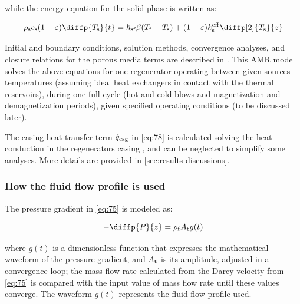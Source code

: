 \documentclass[referee]{svjour3}
\begin{document}


\noindent while the energy equation for the solid phase is written as:

\begin{equation}
\label{eq:88}
  \rho\ped{s} c\ped{s}(1 - \varepsilon)\diffp{T\ped{s}}{t} = \hheat\ped{sf}\beta(T\ped{f}-T\ped{s}) + (1-\varepsilon)k\ped{s}\ap{eff}\diffp[2]{T\ped{s}}{z}
\end{equation}

Initial and boundary conditions, solution methods, convergence analyses, and closure relations for the porous media terms are described in \cite{bib:trevizoli16_perfor_model}. This AMR model solves the above equations for one regenerator operating between given sources temperatures (assuming ideal heat exchangers in contact with the thermal reservoirs), during one full cycle (hot and cold blows and  magnetization and demagnetization periods), given specified operating conditions (to be discussed later).

The casing heat transfer term $\dot{q}_{\mathrm{csg}}$ in \autoref{eq:78} is calculated solving the heat conduction in the regenerators casing \cite{bib:trevizoli16_perfor_model}, and can be neglected to simplify some analyses. More details are provided in \autoref{sec:results-discussions}.

\subsubsection{How the fluid flow profile is used}
\label{sec:how-fluid-flow}

The pressure gradient in \autoref{eq:75} is modeled as:

\begin{equation}
\label{eq:76}
-\diffp{P}{z} = \rho\ped{f} A\ped{t} g(t)
\end{equation}

\noindent where \(g(t)\) is a dimensionless function that expresses the mathematical waveform of the pressure gradient, and  \(A_{\mathrm{t}}\) is its amplitude,  adjusted in a convergence loop; the mass flow rate calculated from the Darcy velocity from \autoref{eq:75} is compared with the input value of mass flow rate until these values converge. The waveform $g(t)$ represents the fluid flow profile used.

\end{document}
